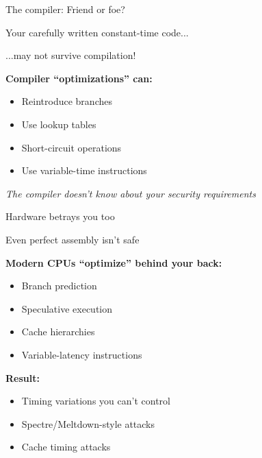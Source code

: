 \documentclass[aspectratio=169, lualatex, handout]{beamer}
\begin{document}
\begin{frame}{The compiler: Friend or foe?}
	\begin{center}
		\Large
		Your carefully written constant-time code...

		\vspace{0.5em}

		...may not survive compilation!
	\end{center}
	\vspace{1em}
	\textbf{Compiler ``optimizations'' can:}
	\begin{itemize}
		\item Reintroduce branches
		\item Use lookup tables
		\item Short-circuit operations
		\item Use variable-time instructions
	\end{itemize}
	\vspace{0.5em}
	\begin{center}
		\textit{The compiler doesn't know about your security requirements}
	\end{center}
\end{frame}

\begin{frame}{Hardware betrays you too}
	\begin{center}
		\Large
		Even perfect assembly isn't safe
	\end{center}
	\vspace{1em}
	\textbf{Modern CPUs ``optimize'' behind your back:}
	\begin{itemize}
		\item Branch prediction
		\item Speculative execution
		\item Cache hierarchies
		\item Variable-latency instructions
	\end{itemize}
	\vspace{0.5em}
	\textbf{Result:}
	\begin{itemize}
		\item Timing variations you can't control
		\item Spectre/Meltdown-style attacks
		\item Cache timing attacks
	\end{itemize}
\end{frame}
\end{document}
